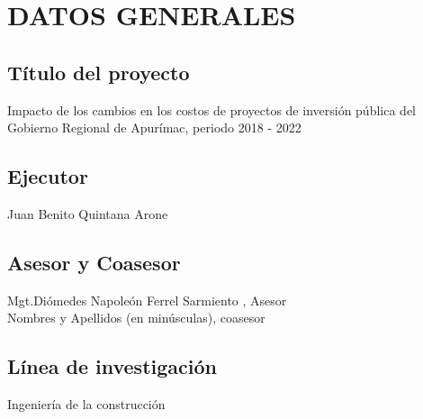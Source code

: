 \newpage
\chapter*{DATOS GENERALES}

\section*{Título del proyecto}
Impacto de los cambios en los costos de proyectos de inversión pública del Gobierno Regional de Apurímac, periodo 2018 - 2022
\section*{Ejecutor} 
\noindent Juan Benito Quintana Arone

\section*{Asesor y Coasesor}
\noindent Mgt.Diómedes Napoleón Ferrel Sarmiento , Asesor\\
Nombres y Apellidos (en minúsculas), coasesor

\section*{Línea de investigación}
\noindent Ingeniería de la construcción

\newpage

